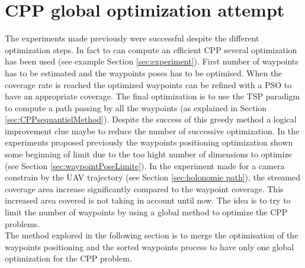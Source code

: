 \section{CPP global optimization attempt}

The experiments made previously were successful despite the different optimization steps. In fact to can compute an efficient CPP several optimization has been used (see example Section \ref{sec:experiment}). %
First number of waypoints has to be estimated and the waypoints poses has to be optimised. When the coverage rate is reached the optimized waypoints can be refined with a PSO to have an appropriate coverage. The final optimization is to use the TSP paradigm to compute a path passing by all the waypoints (as explained in Section \ref{sec:CPPsequantielMethod}). %
Despite the success of this greedy method a logical improvement clue maybe to reduce the number of successive optimization. In the experiments proposed previously the waypoints positioning optimization shown some beginning of limit due to the too hight number of dimensions to optimize (see Section \ref{sec:waypointPoseLimite}). 
In the experiment made for a camera constrain by the UAV trajectory (see Section \ref{sec:holonomie path}), the streamed coverage area increase significantly compared to the waypoint coverage. This increased area covered is not taking in account until now. The idea is to try to limit the number of waypoints by using a global method to optimize the CPP problems.\\
The method explored in the following section is to merge the optimisation of the waypoints positioning and the sorted waypoints process to have only one global optimization for the CPP problem. 
 
